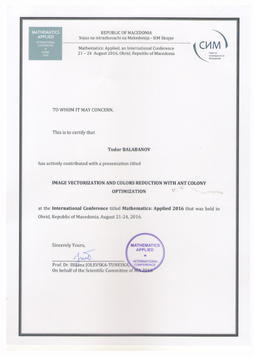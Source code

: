 \documentclass[english,a4paper]{europasscv}
\begin{document}
\includegraphics[width=\textwidth,height=\textheight,keepaspectratio]{MA2016}
\end{document}
